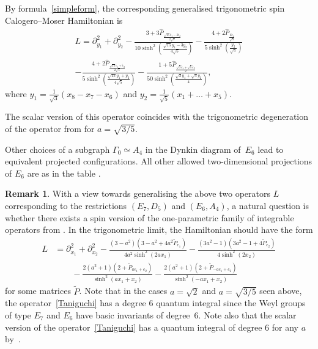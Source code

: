 \documentclass[12pt]{amsart}
\numberwithin{equation}{section}
\theoremstyle{definition}
\newtheorem{remark}[theorem]{Remark}
\begin{document}
By formula~\eqref{simpleform}, the corresponding generalised trigonometric spin Calogero--Moser Hamiltonian is
\begin{equation*}
\begin{array}{c}
\displaystyle{
    L = \partial_{y_1}^2 + \partial_{y_2}^2 - 
    \frac{3 + 3 \widehat{P}_{\frac{\sqrt{15} \widetilde{e}_1 - 3 \widetilde{e}_2}{2 \sqrt{5}}}}{10 \sinh^2(\frac{\sqrt{15}y_1 - 3 y_2}{4 \sqrt{5}})} -
    \frac{4 + 2 \widehat{P}_{\frac{2 \widetilde{e}_2}{\sqrt{5}}}}{5 \sinh^2(\frac{y_2}{\sqrt{5}})}
    }
    \\ 
    \displaystyle{
     - \frac{4 + 2 \widehat{P}_{\frac{\sqrt{15}\widetilde{e}_1 + \widetilde{e}_2}{2 \sqrt{5}}}}{5 \sinh^2 (\frac{\sqrt{15}y_1 + y_2}{4 \sqrt{5}})}
     - \frac{1 + 5 \widehat{P}_{\frac{\sqrt{3}\widetilde{e}_1 + \sqrt{5} \widetilde{e}_2}{2}}}{50 \sinh^2 (\frac{\sqrt{3}y_1 + \sqrt{5}y_2}{4})},
    }
\end{array}
\end{equation*}
where $y_1 = \frac{1}{\sqrt{3}}(x_8 - x_7 - x_6)$ and $y_2 = \frac{1}{\sqrt{5}}(x_1 + \dots + x_5)$.

The scalar version of this operator coincides with the trigonometric degeneration of the operator from \cite[Theorem 1.4]{Taniguchi} for $a=\sqrt{3/5}$.

Other choices of a subgraph $\Gamma_0 \simeq A_4$ in the Dynkin diagram of~$E_6$ lead to equivalent projected configurations.
All other allowed two-dimensional projections of $E_6$ are as in the table \cite[p.~273]{Feigin}. 

\begin{remark}
   With a view towards generalising the above two operators $L$ corresponding to the restrictions $(E_7,D_5)$ and $(E_6,A_4)$,
   a natural question is whether there exists a spin version of the one-parametric family of integrable operators from \cite[Theorem 1.4]{Taniguchi}. In the trigonometric limit, the  Hamiltonian should have the form
   \begin{align}\label{Taniguchi}
        L &= \partial_{x_1}^2 + \partial_{x_2}^2 - 
        \frac{(3-a^2)\left(3-a^2 + 4a^2 \widetilde{P}_{e_1}\right)}{4a^2 \sinh^2(2ax_1)} -
        \frac{(3a^2-1)\left(3a^2-1+4\widetilde{P}_{e_2}\right)}{4 \sinh^2(2x_2)}
         \\ 
         &\qquad - \frac{2(a^2+1)\left(2+\widetilde{P}_{ae_1 + e_2}\right)}{\sinh^2(ax_1+x_2)}
         - \frac{2(a^2+1)\left(2+\widetilde{P}_{-ae_1 + e_2}\right)}{\sinh^2(-ax_1+x_2)} \nonumber
    \end{align}
    for some matrices $\widetilde{P}$. Note that in the cases $a=\sqrt{2}$ and $a=\sqrt{3/5}$ seen above, the operator~\eqref{Taniguchi} has a degree $6$ quantum integral since the Weyl groups of type $E_7$ and $E_6$ have basic invariants of degree~$6$. Note also that the scalar version of the operator~\eqref{Taniguchi} has a quantum integral of degree $6$ for any $a$ by~\cite{Taniguchi}.  
\end{remark}
\end{document}
